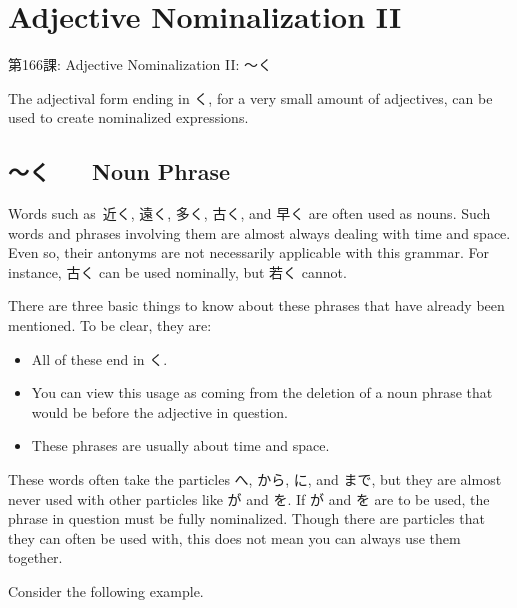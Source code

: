     
\chapter{Adjective Nominalization II}

\begin{center}
\begin{Large}
第166課: Adjective Nominalization II: ～く 
\end{Large}
\end{center}
 
\par{ The adjectival form ending in く, for a very small amount of adjectives, can be used to create nominalized expressions. }
      
\section{～く　\textrightarrow 　Noun Phrase}
 
\par{ Words such as 近く, 遠く, 多く, 古く, and 早く are often used as nouns. Such words and phrases involving them are almost always dealing with time and space. Even so, their antonyms are not necessarily applicable with this grammar. For instance, 古く can be used nominally, but 若く cannot. }

\par{ There are three basic things to know about these phrases that have already been mentioned. To be clear, they are: }

\begin{itemize}

\item All of these end in く. 
\item You can view this usage as coming from the deletion of a noun phrase that would be before the adjective in question. 
\item These phrases are usually about time and space. 
\end{itemize}

\par{ These words often take the particles へ, から, に, and まで, but they are almost never used with other particles like が and を. If が and を are to be used, the phrase in question must be fully nominalized. Though there are particles that they can often be used with, this does not mean you can always use them together. }

\par{ Consider the following example. }

